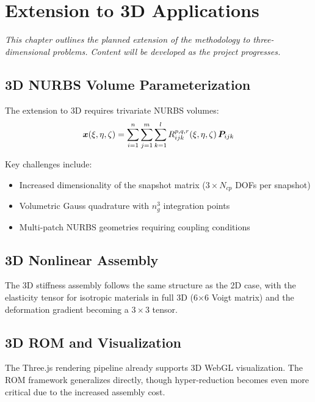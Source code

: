 \chapter{Extension to 3D Applications}
\label{ch:3d-extension}

\textit{This chapter outlines the planned extension of the methodology to three-dimensional problems. Content will be developed as the project progresses.}

\section{3D NURBS Volume Parameterization}
\label{sec:3d-nurbs}

The extension to 3D requires trivariate NURBS volumes:
\begin{equation}
    \bm{x}(\xi, \eta, \zeta) = \sum_{i=1}^{n} \sum_{j=1}^{m} \sum_{k=1}^{l} R_{ijk}^{p,q,r}(\xi, \eta, \zeta) \, \bm{P}_{ijk}
\end{equation}

Key challenges include:
\begin{itemize}
    \item Increased dimensionality of the snapshot matrix ($3 \times N_{cp}$ DOFs per snapshot)
    \item Volumetric Gauss quadrature with $n_g^3$ integration points
    \item Multi-patch NURBS geometries requiring coupling conditions
\end{itemize}


\section{3D Nonlinear Assembly}
\label{sec:3d-assembly}

The 3D stiffness assembly follows the same structure as the 2D case, with the elasticity tensor for isotropic materials in full 3D (6$\times$6 Voigt matrix) and the deformation gradient becoming a $3 \times 3$ tensor.


\section{3D ROM and Visualization}
\label{sec:3d-rom}

The Three.js rendering pipeline already supports 3D WebGL visualization. The ROM framework generalizes directly, though hyper-reduction becomes even more critical due to the increased assembly cost.

